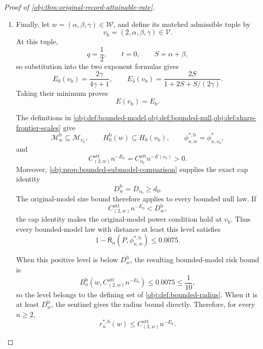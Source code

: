 \documentclass[11pt]{article}
\begin{document}
\begin{proof}[Proof of \cref{obj:thm:original-record-attainable-rate}]
\begin{enumerate}
\item Finally, let \(w=(\alpha,\beta,\gamma)\in\mathcal W\), and define its matched admissible tuple by
\[
v_{\mathrm b}=(2,\alpha,\beta,\gamma)\in\mathcal V.
\]
At this tuple,
\[
q=\frac12,\qquad t=0,\qquad S=\alpha+\beta,
\]
so substitution into the two exponent formulas gives
\[
E_0(v_{\mathrm b})=\frac{2\gamma}{4\gamma+1},
\qquad
E_4(v_{\mathrm b})
=\frac{2S}{1+2S+S/(2\gamma)}.
\]
Taking their minimum proves
\[
E(v_{\mathrm b})=E_{\mathrm b}.
\]

The definitions in
\cref{obj:def:bounded-model,obj:def:bounded-null,obj:def:sharp-frontier-scales}
give
\[
\mathcal M_w^{\mathrm b}\subseteq\mathcal M_{v_{\mathrm b}},
\qquad
H_0^{\mathrm b}(w)\subseteq H_0(v_{\mathrm b}),
\qquad
\phi^{*,\mathrm b}_{n,w}=\phi^*_{n,v_{\mathrm b}},
\]
and
\[
C^{\mathrm{att}}_{(2,w)}n^{-E_{\mathrm b}}
=C^{\mathrm{att}}_{v_{\mathrm b}}n^{-E(v_{\mathrm b})}>0.
\]
Moreover, \cref{obj:prop:bounded-submodel-comparison} supplies the exact cap identity
\[
D_w^{\mathrm b}=D_{v_{\mathrm b}}\ge d_0.
\]
The original-model size bound therefore applies to every bounded null law. If
\[
C^{\mathrm{att}}_{(2,w)}n^{-E_{\mathrm b}}<D_w^{\mathrm b},
\]
the cap identity makes the original-model power condition hold at
\(v_{\mathrm b}\). Thus every bounded-model law with distance at least this level satisfies
\[
1-\mathsf R_n(P,\phi^{*,\mathrm b}_{n,w})\le0.0075.
\]

When this positive level is below \(D_w^{\mathrm b}\), the resulting bounded-model risk bound is
\[
B_n^{\mathrm b}
\!\left(w,C^{\mathrm{att}}_{(2,w)}n^{-E_{\mathrm b}}\right)
\le0.0075\le\frac1{10},
\]
so the level belongs to the defining set of
\cref{obj:def:bounded-radius}. When it is at least \(D_w^{\mathrm b}\), the sentinel gives the radius bound directly. Therefore, for every \(n\ge2\),
\[
r_n^{*,\mathrm b}(w)
\le C^{\mathrm{att}}_{(2,w)}n^{-E_{\mathrm b}}.
\]
\end{enumerate}
\end{proof}
\end{document}
